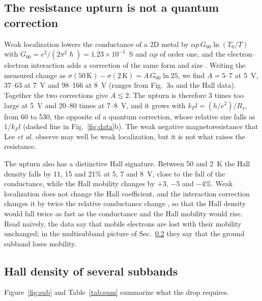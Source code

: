 \documentclass[11pt]{article}
\begin{document}
\subsection{The resistance upturn is not a quantum correction}\label{sec:upturn}
Weak localization lowers the conductance of a 2D metal by $\alpha p\,G_{00}\ln(T_0/T)$ with $G_{00}=e^2/(2\pi^2\hslash)=1.23\times10^{-5}$~S and $\alpha p$ of order one, and the electron--electron interaction adds a correction of the same form and size \cite{AltshulerAronov1980,LeeRamakrishnan1985}. Writing the measured change as $\sigma(50\,\mathrm{K})-\sigma(2\,\mathrm{K})=A\,G_{00}\ln 25$, we find $A=5$--7 at 5~V, 37--63 at 7~V and 98--166 at 8~V (ranges from Fig.~3a and the Hall data). Together the two corrections give $A\lesssim2$. The upturn is therefore 3 times too large at 5~V and 20--80 times at 7--8~V, and it grows with $k_Fl=(h/e^2)/R_s$, from 60 to 530, the opposite of a quantum correction, whose relative size falls as $1/k_Fl$ (dashed line in Fig.~\ref{fig:data}b). The weak negative magnetoresistance that Lee \emph{et al.} observe may well be weak localization, but it is not what raises the resistance.

The upturn also has a distinctive Hall signature. Between 50 and 2~K the Hall density falls by 11, 15 and 21\% at 5, 7 and 8~V, close to the fall of the conductance, while the Hall mobility changes by $+3$, $-5$ and $-4$\%. Weak localization does not change the Hall coefficient, and the interaction correction changes it by twice the relative conductance change \cite{AltshulerAronov1980,LeeRamakrishnan1985}, so that the Hall density would fall twice as fast as the conductance and the Hall mobility would rise. Read naively, the data say that mobile electrons are lost with their mobility unchanged; in the multisubband picture of Sec.~\ref{sec:sub} they say that the ground subband loses mobility.

\subsection{Hall density of several subbands}\label{sec:sub}
Figure~\ref{fig:sub} and Table~\ref{tab:sum} summarize what the drop requires.
\end{document}
